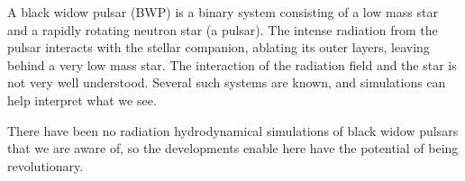 A black widow pulsar (BWP) is a binary system consisting of a low mass
star and a rapidly rotating neutron star (a pulsar).  The intense
radiation from the pulsar interacts with the stellar companion,
ablating its outer layers, leaving behind a very low mass star.  The
interaction of the radiation field and the star is not very well
understood.  Several such systems are known, and simulations can
help interpret what we see.

There have been no radiation hydrodynamical simulations of black widow
pulsars that we are aware of, so the developments enable here have the
potential of being revolutionary.


